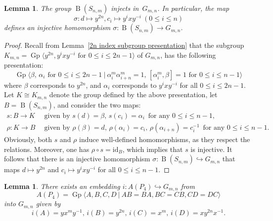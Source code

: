 \documentclass{amsart}
\newcommand{\Ggen}[1]{\operatorname{Gp}\bigl\langle #1 \bigr\rangle}
\newcommand{\Gpres}[2]{\operatorname{Gp}\bigl\langle #1\:|\:#2 \bigr\rangle}
\theoremstyle{plain}
\newtheorem{lemma}[theorem]{Lemma}
\theoremstyle{definition}
\begin{document}
\begin{lemma}\label{B(S_{m,n}) injects in G_{m,n}}
The group $\operatorname{B}(S_{n,m})$ injects in~$G_{m,n}$. In particular, the map 
\begin{equation}\label{Eq:Sigma-embedding}
\sigma \colon d \mapsto y^{2n}, c_i \mapsto y^ixy^{-i} \: (0 \leq i \leq n)
\end{equation}
defines an injective homomorphism $\sigma \colon \operatorname{B}(S_{n,m}) \to G_{m,n}$.
\end{lemma}
\begin{proof}
Recall from Lemma~\ref{2n index subgroup presentation} 
that the subgroup $K_{m,n} = \Ggen{y^{2n}, y^i x y^{-i} \text{ for $0 \leq i \leq 2n - 1$}}$ of $G_{m,n}$, has the following presentation:
\[
\Gpres{\beta,\, \alpha_i \text{ for $0 \leq i \leq 2n - 1$}}{\alpha_i^m \alpha_{i+n}^m=1,\, [\alpha_i^m, \beta]=1 \text{ for $0 \leq i \leq n - 1$}}
\]
where $\beta$ corresponds to $y^{2n}$, and $\alpha_i$ corresponds to $y^i x y^{-i}$ for all $0 \leq i \leq 2n - 1$.    
Let $K \cong K_{m,n} $ denote the group defined by the above presentation, let $B = \operatorname{B}(S_{n,m})$, and 
consider the two maps:
\begin{align*}
s: B \longrightarrow K\, & \text{ given by } s(d) = \beta,\, s(c_i) = \alpha_i\, \text{ for any } 0 \leq i \leq n - 1,\\
\rho: K \longrightarrow B\, & \text{ given by } \rho(\beta) = d,\, \rho(\alpha_i) = c_i,\, \rho(\alpha_{i+n}) = c_i^{-1}\, \text{ for any } 0 \leq i \leq n - 1.
\end{align*}
Obviously, both $s$ and $\rho$ induce well-defined homomorphisms, as they respect the relations. Moreover, one has $\rho\circ s = \text{id}_B$, which implies that $s$ is injective. 
It follows that there is an injective homomorphism  
$\sigma:\operatorname{B}(S_{n,m}) \hookrightarrow G_{m,n}$ 
that maps $d \mapsto y^{2n}$ and $c_i \mapsto y^i x y^{-i}$ for all $0 \leq i \leq n - 1$.     
\end{proof}

\begin{lemma}\label{A(P_4) inside G_{m,n}}
There exists an embedding $i\colon A(P_4) \hookrightarrow G_{m,n}$ 
from 
\[
A(P_4) = \Gpres{A, B, C, D}{AB = BA, BC = CB, CD = DC} 
\]
into $G_{m,n}$ given by 
\[
i(A) = y x^m y^{-1},\, i(B) = y^{2n},\, i(C) = x^m,\, i(D) = x y^{2n} x^{-1}.
\]
\end{lemma}
\end{document}
